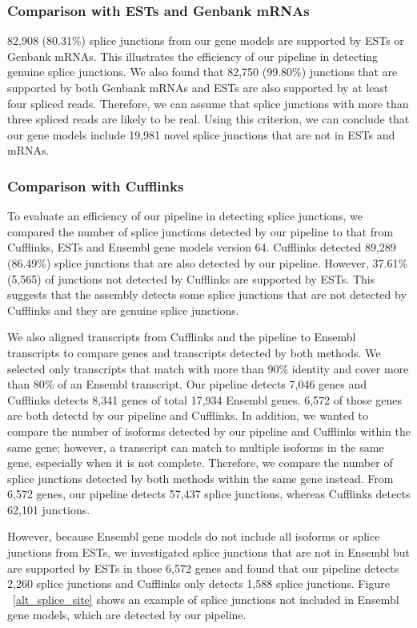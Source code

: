 \documentclass[10pt]{article}
\begin{document}
\subsubsection*{Comparison with ESTs and Genbank mRNAs}
82,908 (80.31\%) splice junctions from our gene models are supported by ESTs or Genbank mRNAs.
This illustrates the efficiency of our pipeline in detecting genuine splice junctions.
We also found that 82,750 (99.80\%) junctions that are supported by both Genbank mRNAs and ESTs are also supported by at least four spliced reads.
Therefore, we can assume that splice junctions with more than three spliced reads are likely to be real.
Using this criterion, we can conclude that our gene models include 19,981 novel splice junctions that are not in ESTs and mRNAs.

\subsubsection*{Comparison with Cufflinks}
To evaluate an efficiency of our pipeline in detecting splice junctions,
we compared the number of splice junctions detected by our pipeline to that from Cufflinks\cite{Trapnell:2010kd}, ESTs and
Ensembl gene models version 64.
Cufflinks detected 89,289 (86.49\%) splice junctions that are also detected by our pipeline.
However, 37.61\% (5,565) of junctions not detected by Cufflinks are supported by ESTs.
This suggests that the assembly detects some splice junctions that are not detected by Cufflinks and they are
genuine splice junctions.

We also aligned transcripts from Cufflinks and the pipeline to Ensembl transcripts to compare genes and transcripts detected by
both methods.
We selected only transcripts that match with more than 90\% identity and cover more than 80\% of an Ensembl transcript.
Our pipeline detects 7,046 genes and Cufflinks detects 8,341 genes of total 17,934 Ensembl genes.
6,572 of those genes are both detectd by our pipeline and Cufflinks.
In addition, we wanted to compare the number of isoforms detected by our pipeline and Cufflinks within the same gene; however,
a transcript can match to multiple isoforms in the same gene, especially when it is not complete.
Therefore, we compare the number of splice junctions detected by both methods within the same gene instead.
From 6,572 genes, our pipeline detects 57,437 splice junctions, whereas Cufflinks detects 62,101 junctions.

However, because Ensembl gene models do not include all isoforms or splice junctions from ESTs, we investigated splice junctions
that are not in Ensembl but are supported by ESTs in those 6,572 genes and found that our pipeline detects 2,260 splice junctions
and Cufflinks only detects 1,588 splice junctions. Figure ~\ref{alt_splice_site} shows an example of splice junctions not included in Ensembl gene models, which are detected by our pipeline.
\end{document}
